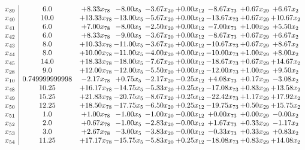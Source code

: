 \documentclass[8pt]{article}
\begin{document}
\[\begin{array}{c| c c@{\hskip 2pt} c@{\hskip 2pt} c@{\hskip 2pt} c@{\hskip 2pt} c@{\hskip 2pt} c@{\hskip 2pt} c@{\hskip 2pt} }
 x_{39}   &  6.0 & +  8.33 x_{78} & -8.00 x_{5} & -3.67 x_{20} & +  0.00 x_{12} & -8.67 x_{73} & +  0.67 x_{29} & +  6.67 x_{2}\\
 x_{40}   &  10.0 & + 13.33 x_{78} & -13.00 x_{5} & -5.67 x_{20} & +  0.00 x_{12} & -13.67 x_{73} & +  0.67 x_{29} & + 10.67 x_{2}\\
 x_{41}   &  6.0 & +  7.00 x_{78} & -8.00 x_{5} & -2.50 x_{20} & +  0.00 x_{12} & -7.00 x_{73} & +  1.00 x_{29} & +  5.50 x_{2}\\
 x_{42}   &  6.0 & +  8.33 x_{78} & -9.00 x_{5} & -3.67 x_{20} & +  0.00 x_{12} & -8.67 x_{73} & +  0.67 x_{29} & +  6.67 x_{2}\\
 x_{43}   &  8.0 & + 10.33 x_{78} & -11.00 x_{5} & -3.67 x_{20} & +  0.00 x_{12} & -10.67 x_{73} & +  0.67 x_{29} & +  8.67 x_{2}\\
 x_{44}   &  8.0 & + 10.00 x_{78} & -11.00 x_{5} & -4.00 x_{20} & +  0.00 x_{12} & -10.00 x_{73} & +  1.00 x_{29} & +  8.00 x_{2}\\
 x_{45}   &  14.0 & + 18.33 x_{78} & -18.00 x_{5} & -7.67 x_{20} & +  0.00 x_{12} & -18.67 x_{73} & +  0.67 x_{29} & + 14.67 x_{2}\\
 x_{28}   &  9.0 & + 12.00 x_{78} & -12.00 x_{5} & -5.50 x_{20} & +  0.00 x_{12} & -12.00 x_{73} & +  1.00 x_{29} & +  9.50 x_{2}\\
 x_{10}   &  0.749999999998 & -2.17 x_{78} & +  0.75 x_{5} & -2.17 x_{20} & -0.25 x_{12} & +  4.08 x_{73} & +  0.17 x_{29} & -3.08 x_{2}\\
 x_{48}   &  10.25 & + 16.17 x_{78} & -14.75 x_{5} & -5.33 x_{20} & +  0.25 x_{12} & -17.08 x_{73} & +  0.83 x_{29} & + 13.58 x_{2}\\
 x_{49}   &  15.25 & + 21.83 x_{78} & -20.75 x_{5} & -8.67 x_{20} & +  0.25 x_{12} & -22.42 x_{73} & +  1.17 x_{29} & + 17.92 x_{2}\\
 x_{50}   &  12.25 & + 18.50 x_{78} & -17.75 x_{5} & -6.50 x_{20} & +  0.25 x_{12} & -19.75 x_{73} & +  0.50 x_{29} & + 15.75 x_{2}\\
 x_{51}   &  1.0 & +  1.00 x_{78} & -1.00 x_{5} & -1.00 x_{20} & -0.00 x_{12} & +  0.00 x_{73} & +  0.00 x_{29} & -0.00 x_{2}\\
 x_{52}   &  2.0 & +  0.67 x_{78} & -1.00 x_{5} & -2.83 x_{20} & -0.00 x_{12} & +  1.67 x_{73} & +  0.33 x_{29} & -1.17 x_{2}\\
 x_{53}   &  3.0 & +  2.67 x_{78} & -3.00 x_{5} & -3.83 x_{20} & -0.00 x_{12} & -0.33 x_{73} & +  0.33 x_{29} & +  0.83 x_{2}\\
 x_{54}   &  11.25 & + 17.17 x_{78} & -15.75 x_{5} & -5.83 x_{20} & +  0.25 x_{12} & -18.08 x_{73} & +  0.83 x_{29} & + 14.08 x_{2}\\

\end{array}\]
\end{document}
